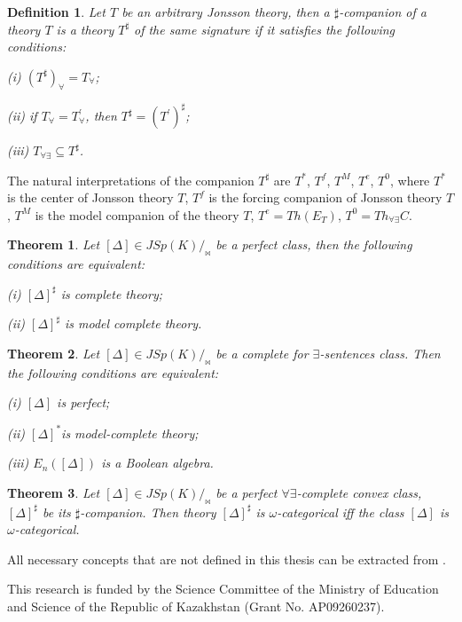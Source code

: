 \documentclass[bsl,meeting]{asl}
\newtheorem{definition}{Definition}
\newtheorem{theorem}{Theorem}
\begin{document}
\begin{definition} Let $T$ be an arbitrary Jonsson theory, then a $\sharp$-companion of a theory $T$ is
a theory $T^\sharp$ of the same signature if it satisfies the following conditions: 

(i) $(T^\sharp)_\forall= T_\forall$;

(ii) if $T_\forall=T^\prime_\forall$, then $T^\sharp=(T^\prime)^\sharp$;

(iii) $T_{\forall\exists}\subseteq T^\sharp$.
\end{definition}
The natural interpretations of the companion $T^\sharp$ are $T^*$, $T^f$, $T^M$, $T^e$, $T^0$, where $T^*$ is the center of Jonsson theory $T$, $T^f$ is the forcing companion of Jonsson theory $T$, $T^M$ is the model
companion of the theory $T$, $T^e=Th(E_T)$, $T^0=Th_{\forall\exists}C$.

\begin{theorem}
Let $[\Delta]\in JSp(K)/_{\bowtie}$ be a perfect class, then the following conditions are equivalent:

(i) $[\Delta]^\sharp$ is complete theory;

(ii) $[\Delta]^\sharp$ is model complete theory.
\end{theorem}
\begin{theorem}
Let $[\Delta]\in JSp(K)/_{\bowtie}$ be a complete for $\exists$-sentences class. Then the following
conditions are equivalent:

(i) $[\Delta]$ is perfect;

(ii) $[\Delta]^*$is model-complete theory;

(iii) $E_n([\Delta])$ is a Boolean algebra.
\end{theorem}

\begin{theorem}
Let $[\Delta]\in JSp(K)/_{\bowtie}$ be a perfect $\forall\exists$-complete convex class, $[\Delta]^\sharp$ be its $\sharp$-companion. Then theory $[\Delta]^\sharp$ is $\omega$-categorical iff the class $[\Delta]$ is $\omega$-categorical.
\end{theorem}

All necessary concepts that are not defined in this thesis can be extracted from \cite{1}.

This research is funded by the Science Committee of the Ministry of Education and Science of the Republic of Kazakhstan (Grant No. AP09260237).
\end{document}
